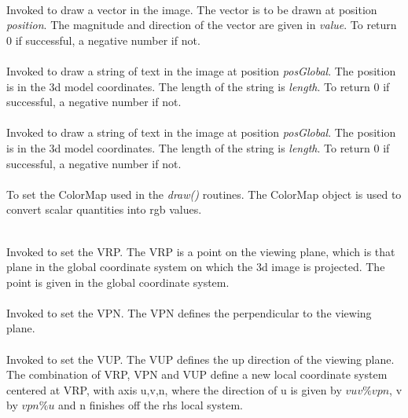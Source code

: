 \\
Invoked to draw a vector in the image. The vector is to be drawn
at position {\em position}. The magnitude and direction of the vector
are given in {\em value}. To return $0$ if successful, a negative
number if not.\\ 


\\
Invoked to draw a string of text in the image at position {\em
posGlobal}. The position is in the 3d model coordinates. The length of
the string is {\em length}. To return $0$ if successful, a negative
number if not.\\ 


\\
Invoked to draw a string of text in the image at position {\em
posGlobal}. The position is in the 3d model coordinates. The length of
the string is {\em length}. To return $0$ if successful, a negative
number if not.\\ 

\\
To set the ColorMap used in the {\em draw()} routines. The ColorMap
object is used to convert scalar quantities into rgb values. 


\\
Invoked to set the VRP. The VRP is a point on the viewing plane, which
is that plane in the global coordinate system on which the 3d image is
projected. The point is given in the global coordinate system. \\

\\
Invoked to set the VPN. The VPN defines the perpendicular to the
viewing plane. \\

\\
Invoked to set the VUP. The VUP defines the up direction of the
viewing plane. The combination of VRP, VPN and VUP define a new local
coordinate system centered at VRP, with axis u,v,n, where the
direction of u is given by $vuv \% vpn$, v by $vpn \% u$ and n
finishes off the rhs local system. \\

